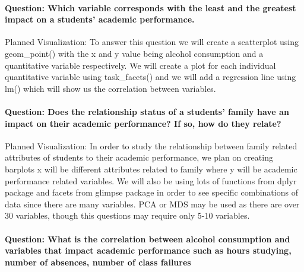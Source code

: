 \documentclass[
]{article}
\begin{document}
\hypertarget{question-which-variable-corresponds-with-the-least-and-the-greatest-impact-on-a-students-academic-performance.}{%
\paragraph{Question: Which variable corresponds with the least and the
greatest impact on a students' academic
performance.}\label{question-which-variable-corresponds-with-the-least-and-the-greatest-impact-on-a-students-academic-performance.}}

Planned Visualization: To answer this question we will create a
scatterplot using geom\_point() with the x and y value being alcohol
consumption and a quantitative variable respectively. We will create a
plot for each individual quantitative variable using task\_facets() and
we will add a regression line using lm() which will show us the
correlation between variables.

\hypertarget{question-does-the-relationship-status-of-a-students-family-have-an-impact-on-their-academic-performance-if-so-how-do-they-relate}{%
\paragraph{Question: Does the relationship status of a students' family
have an impact on their academic performance? If so, how do they
relate?}\label{question-does-the-relationship-status-of-a-students-family-have-an-impact-on-their-academic-performance-if-so-how-do-they-relate}}

Planned Visualization: In order to study the relationship between family
related attributes of students to their academic performance, we plan on
creating barplots x will be different attributes related to family where
y will be academic performance related variables. We will also be using
lots of functions from dplyr package and facets from glimpse package in
order to see specific combinations of data since there are many
variables. PCA or MDS may be used as there are over 30 variables, though
this questions may require only 5-10 variables.

\hypertarget{question-what-is-the-correlation-between-alcohol-consumption-and-variables-that-impact-academic-performance-such-as-hours-studying-number-of-absences-number-of-class-failures}{%
\paragraph{Question: What is the correlation between alcohol consumption
and variables that impact academic performance such as hours studying,
number of absences, number of class
failures}\label{question-what-is-the-correlation-between-alcohol-consumption-and-variables-that-impact-academic-performance-such-as-hours-studying-number-of-absences-number-of-class-failures}}
\end{document}
